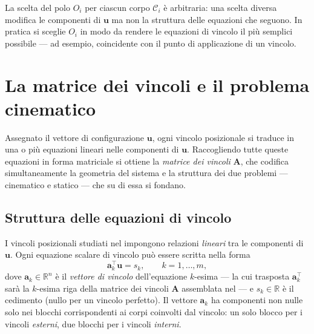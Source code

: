\begin{oss}
	La scelta del polo $O_i$ per ciascun corpo $\mathcal{C}_i$ è
	arbitraria: una scelta diversa modifica le componenti di
	$\bm{u}$ ma non la struttura delle equazioni che seguono. In
	pratica si sceglie $O_i$ in modo da rendere le equazioni di
	vincolo il più semplici possibile --- ad esempio, coincidente
	con il punto di applicazione di un vincolo.
\end{oss}




\section{La matrice dei vincoli e il problema cinematico}
\label{sec:matrice_vincoli}

Assegnato il vettore di configurazione $\bm{u}$, ogni
vincolo posizionale si traduce in una o più equazioni
lineari nelle componenti di $\bm{u}$. Raccogliendo
tutte queste equazioni in forma matriciale si ottiene
la \emph{matrice dei vincoli} $\bm{A}$, che codifica
simultaneamente la geometria del sistema e la struttura
dei due problemi --- cinematico e statico --- che su
di essa si fondano.

\subsection{Struttura delle equazioni di vincolo}
\label{sec:struttura_vincoli}

I vincoli posizionali studiati nel  impongono
relazioni \emph{lineari} tra le componenti di $\bm{u}$. Ogni
equazione scalare di vincolo può essere scritta nella forma
\begin{equation}\label{eq:vincolo_scalare}
	\bm{a}_k^{\top}\bm{u} = s_k,
	\qquad k = 1, \dots, m,
\end{equation}
dove $\bm{a}_k \in \mathbb{R}^{n}$ è il \emph{vettore di vincolo}
dell'equazione $k$-esima --- la cui trasposta $\bm{a}_k^{\top}$
sarà la $k$-esima riga della matrice dei vincoli $\bm{A}$
assemblata nel  --- e $s_k \in \mathbb{R}$
è il cedimento (nullo per un vincolo perfetto).
Il vettore $\bm{a}_k$ ha componenti non nulle solo nei blocchi corrispondenti ai corpi
coinvolti dal vincolo: un solo blocco per i vincoli
\emph{esterni}, due blocchi per i vincoli \emph{interni}.

